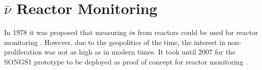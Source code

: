 \section{$\bar{\nu}$ Reactor Monitoring}
In 1978 it was proposed that measuring $\bar{\nu}$s from reactors could be used for reactor monitoring \cite{Borovoi_1978}. However, due to the geopolitics of the time, the interest in non-proliferation was not as high as in modern times. It took until 2007 for the SONGS1 prototype to be deployed as proof of concept for reactor monitoring \cite{Bowden_2007}.
